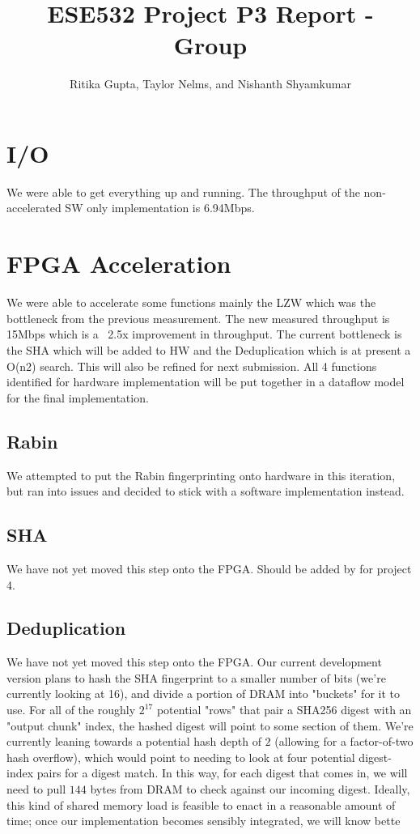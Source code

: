 \documentclass{article}
\title{ESE532 Project P3 Report - Group}
\author{Ritika Gupta, Taylor Nelms, and Nishanth Shyamkumar}
\begin{document}
\maketitle


\section{I/O}

We were able to get everything up and running. The throughput of the non-accelerated SW only implementation is 6.94Mbps. 

\section{FPGA Acceleration}

We were able to accelerate some functions mainly the LZW which was the bottleneck from the previous measurement. The new measured throughput is 15Mbps which is a ~2.5x improvement in throughput. 
The current bottleneck is the SHA which will be added to HW and the Deduplication which is at present a O(n2) search. This will also be refined for next submission. 
All 4 functions identified for hardware implementation will be put together in a dataflow model for the final implementation. 

\subsection{Rabin}

We attempted to put the Rabin fingerprinting onto hardware in this iteration, but ran into issues and decided to stick with a software implementation instead.

\subsection{SHA}

We have not yet moved this step onto the FPGA. Should be added by for project 4. 

\subsection{Deduplication}

We have not yet moved this step onto the FPGA. Our current development version plans to hash the SHA fingerprint to a smaller number of bits (we're currently looking at 16), and divide a portion of DRAM into "buckets" for it to use. For all of the roughly $2^{17}$ potential "rows" that pair a SHA256 digest with an "output chunk" index, the hashed digest will point to some section of them. We're currently leaning towards a potential hash depth of $2$ (allowing for a factor-of-two hash overflow), which would point to needing to look at four potential digest-index pairs for a digest match.
\newline\newline
In this way, for each digest that comes in, we will need to pull $144$ bytes from DRAM to check against our incoming digest. Ideally, this kind of shared memory load is feasible to enact in a reasonable amount of time; once our implementation becomes sensibly integrated, we will know bette
\end{document}
